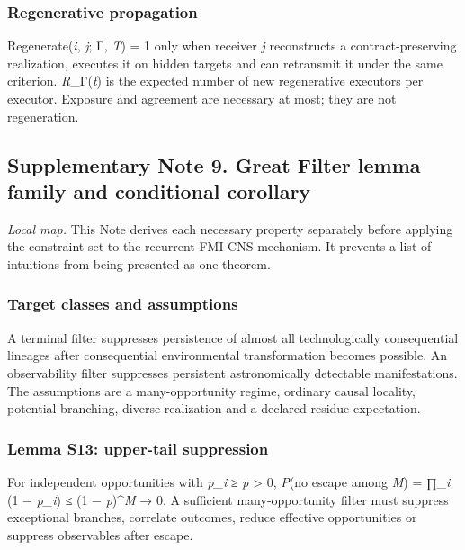 \hypertarget{regenerative-propagation}{%
\subsubsection{Regenerative
propagation}\label{regenerative-propagation}}

Regenerate(\emph{i}, \emph{j}; Γ, \emph{T}) = 1 only when receiver
\emph{j} reconstructs a contract-preserving realization, executes it on
hidden targets and can retransmit it under the same criterion.
\emph{R}\_Γ(\emph{t}) is the expected number of new regenerative
executors per executor. Exposure and agreement are necessary at most;
they are not regeneration.

\hypertarget{supplementary-note-9.-great-filter-lemma-family-and-conditional-corollary}{%
\subsection{Supplementary Note 9. Great Filter lemma family and
conditional
corollary}\label{supplementary-note-9.-great-filter-lemma-family-and-conditional-corollary}}

\emph{Local map.} This Note derives each necessary property separately
before applying the constraint set to the recurrent FMI-CNS mechanism.
It prevents a list of intuitions from being presented as one theorem.

\hypertarget{target-classes-and-assumptions}{%
\subsubsection{Target classes and
assumptions}\label{target-classes-and-assumptions}}

A terminal filter suppresses persistence of almost all technologically
consequential lineages after consequential environmental transformation
becomes possible. An observability filter suppresses persistent
astronomically detectable manifestations. The assumptions are a
many-opportunity regime, ordinary causal locality, potential branching,
diverse realization and a declared residue expectation.

\hypertarget{lemma-s13-upper-tail-suppression}{%
\subsubsection{Lemma S13: upper-tail
suppression}\label{lemma-s13-upper-tail-suppression}}

For independent opportunities with \emph{p\_i} ≥ \emph{p} \textgreater{}
0, \emph{P}(no escape among \emph{M}) = ∏\_\emph{i} (1 − \emph{p\_i}) ≤
(1 − \emph{p})\^{}\emph{M} → 0. A sufficient many-opportunity filter
must suppress exceptional branches, correlate outcomes, reduce effective
opportunities or suppress observables after escape.

